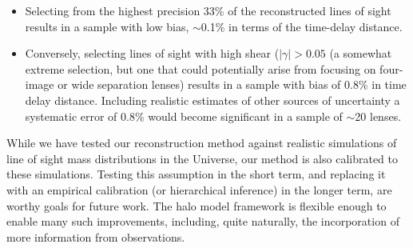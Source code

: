 \documentclass[useAMS,usenatbib,a4paper]{mn2e}
\begin{document}
\begin{itemize}
\item Selecting from the highest precision 33\% of the reconstructed lines of
sight results in a sample with low bias, $\sim$0.1\% in terms of the
time-delay distance. 

\item Conversely, selecting lines of sight with high shear ($|\gamma| > 0.05$
(a somewhat extreme selection, but one that  could potentially arise from 
focusing on four-image or wide separation lenses) results in a sample with
bias of 0.8\% in time delay distance. Including realistic estimates of other
sources of uncertainty a systematic error of 0.8\% would become significant in
a sample of $\sim$20 lenses. 


\end{itemize}





While we have tested our reconstruction method against realistic simulations
of line of sight mass distributions in the Universe, our method is also 
calibrated to these simulations. Testing this assumption in the short term,
and replacing it with an empirical calibration (or hierarchical inference) in
the longer term, are worthy goals for future work. The halo model framework is
flexible enough to enable many such improvements, including, quite naturally,
the incorporation of more information from observations. 
\end{document}

